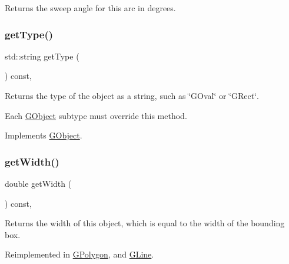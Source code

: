 Returns the sweep angle for this arc in degrees. 

\mbox{\label{classsgl_1_1GArc_a9b72ede4ee8520f987a0c01e30654814}} 
\subsubsection{\texorpdfstring{get\+Type()}{getType()}}
{\footnotesize\ttfamily std\+::string get\+Type (\begin{DoxyParamCaption}{ }\end{DoxyParamCaption}) const\hspace{0.3cm}{\ttfamily [override]}, {\ttfamily [virtual]}}



Returns the type of the object as a string, such as {\ttfamily \char`\"{}\+G\+Oval\char`\"{}} or {\ttfamily \char`\"{}\+G\+Rect\char`\"{}}. 

Each \mbox{\hyperlink{classsgl_1_1GObject}{G\+Object}} subtype must override this method. 

Implements \mbox{\hyperlink{classsgl_1_1GObject_a799e073a127b428cc841086d42ea4fed}{G\+Object}}.

\mbox{\label{classsgl_1_1GObject_a0ed2965abd4f5701d2cadf71239faf19}} 
\subsubsection{\texorpdfstring{get\+Width()}{getWidth()}}
{\footnotesize\ttfamily double get\+Width (\begin{DoxyParamCaption}{ }\end{DoxyParamCaption}) const\hspace{0.3cm}{\ttfamily [virtual]}, {\ttfamily [inherited]}}



Returns the width of this object, which is equal to the width of the bounding box. 



Reimplemented in \mbox{\hyperlink{classsgl_1_1GPolygon_ab7b172cec7ed45e1246a3ce3160a62f7}{G\+Polygon}}, and \mbox{\hyperlink{classsgl_1_1GLine_ab7b172cec7ed45e1246a3ce3160a62f7}{G\+Line}}.

